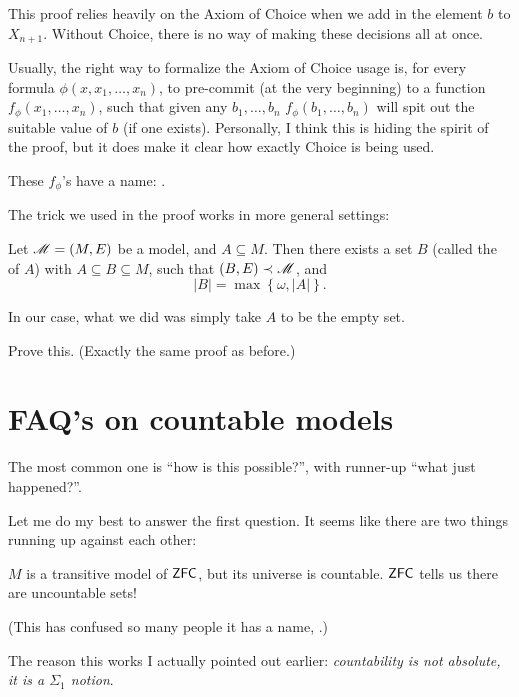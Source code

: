 \begin{remark}
	This proof relies heavily on the Axiom of Choice
	when we add in the element $b$ to $X_{n+1}$.
	Without Choice, there is no way of making these decisions all at once.

	Usually, the right way to formalize the Axiom of Choice usage is,
	for every formula $\phi(x, x_1, \dots, x_n)$, to pre-commit (at the very beginning)
	to a function $f_\phi(x_1, \dots, x_n)$, such that given any $b_1, \dots, b_n$
	$f_\phi(b_1, \dots, b_n)$ will spit out the suitable value of $b$ (if one exists).
	Personally, I think this is hiding the spirit of the proof, but it does
	make it clear how exactly Choice is being used.

	These $f_\phi$'s have a name: .
\end{remark}

The trick we used in the proof works in more general settings:
\begin{theorem}
	Let $\mathscr M = (M,E)$ be a model, and $A \subseteq M$.
	Then there exists a set $B$ (called the  of $A$)
	with $A \subseteq B \subseteq M$,
	such that $(B,E) \prec \mathscr M$, and
	\[ \left\lvert B \right\rvert =
		\max \left\{ \omega, \left\lvert A \right\rvert \right\}. \]
\end{theorem}
In our case, what we did was simply take $A$ to be the empty set.
\begin{ques}
	Prove this. (Exactly the same proof as before.)
\end{ques}


\section{FAQ's on countable models}
The most common one is ``how is this possible?'',
with runner-up ``what just happened?''.

Let me do my best to answer the first question.
It seems like there are two things running up against each other:
\begin{enumerate}[(1)]
	\ii $M$ is a transitive model of $\mathsf{ZFC}$, but its universe is countable.
	\ii $\mathsf{ZFC}$ tells us there are uncountable sets!
\end{enumerate}
(This has confused so many people it has a name, .)

The reason this works I actually pointed out earlier:
\emph{countability is not absolute, it is a $\Sigma_1$ notion}.

